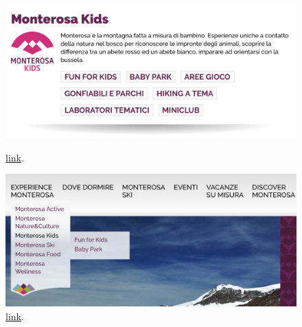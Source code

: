 \documentclass[a4paper, 11pt, parskip=half, headsepline]{scrreprt}
\begin{document}
\begin{figure}[H]
    \begin{minipage}[t]{0.5\textwidth}
        \centering
        \includegraphics[width=1\linewidth, keepaspectratio]{13-interaction-consistency}
        \caption{\href{https://www.visitmonterosa.com/experience-monterosa/}{link}.}
        \label{fig:interaction-consistency-03}
    \end{minipage}   
    \hspace*{\fill}
    \begin{minipage}[t]{0.5\textwidth}
        \centering
        \includegraphics[width=1\linewidth, keepaspectratio]{14-interaction-consistency}
        \caption{\href{https://www.visitmonterosa.com}{link}.}
        \label{fig:interaction-consistency-04}
    \end{minipage} 
\end{figure}
\end{document}
